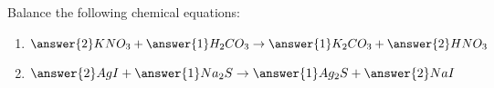 \documentclass{ximera}
\author{Zack Reed}
\begin{document}
\begin{exercise}

Balance the following chemical equations:

\begin{enumerate}

    \item $\answer{2}KNO_3+\answer{1}H_2CO_3\rightarrow \answer{1}K_2CO_3+\answer{2}HNO_3$
    \item $\answer{2}AgI+\answer{1}Na_2S\rightarrow \answer{1}Ag_2S+\answer{2}NaI$
    
\end{enumerate}

\end{exercise}
\end{document}
